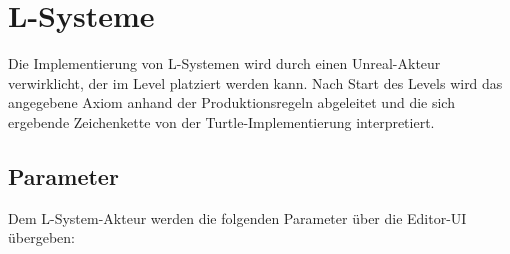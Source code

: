 \section{L-Systeme}

Die Implementierung von L-Systemen wird durch einen Unreal-Akteur verwirklicht, der im Level platziert werden kann. Nach Start des Levels wird das angegebene Axiom anhand der Produktionsregeln abgeleitet und die sich ergebende Zeichenkette von der Turtle-Implementierung interpretiert.

\subsection{Parameter}

Dem L-System-Akteur werden die folgenden Parameter über die Editor-UI übergeben:

